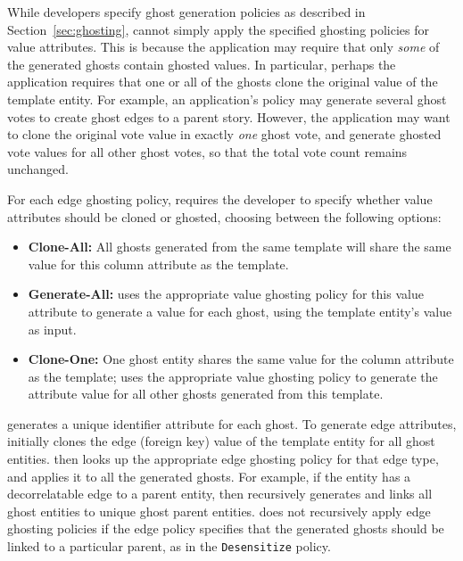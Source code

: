 While developers specify ghost generation policies as described in Section~\ref{sec:ghosting}, \sys
cannot simply apply the specified ghosting policies for value attributes.  This is because the
application may require that only \emph{some} of the generated ghosts contain ghosted values. In
particular, perhaps the application requires that one or all of the ghosts clone the original value
of the template entity. For example, an application's policy may generate several ghost votes to
create ghost edges to a parent story. However, the application may want to clone the original vote
value in exactly \emph{one} ghost vote, and generate ghosted vote values for all other ghost votes,
so that the total vote count remains unchanged. 

For each edge ghosting policy, \sys requires the developer to specify whether value attributes
should be cloned or ghosted, choosing between the following options:
\begin{itemize}
    \item \textbf{Clone-All:} All ghosts generated from the same template will share the same value
        for this column attribute as the template.

    \item \textbf{Generate-All:} \sys uses the appropriate value ghosting policy for this
        value attribute to generate a value for each ghost, using the template entity's value
        as input.

    \item \textbf{Clone-One:} One ghost entity shares the same value for the column attribute as the
        template; \sys uses the appropriate value ghosting policy to generate the attribute value
        for all other ghosts generated from this template.
\end{itemize}

\sys generates a unique identifier attribute for each ghost.  To generate edge attributes, \sys
initially clones the edge (foreign key) value of the template entity for all ghost entities.  \sys
then looks up the appropriate edge ghosting policy for that edge type, and applies it to all the
generated ghosts. For example, if the entity has a decorrelatable edge to a parent entity, then \sys
recursively generates and links all ghost entities to unique ghost parent entities. \sys does not
recursively apply edge ghosting policies if the edge policy specifies that the generated ghosts
should be linked to a particular parent, as in the \texttt{Desensitize} policy. 

